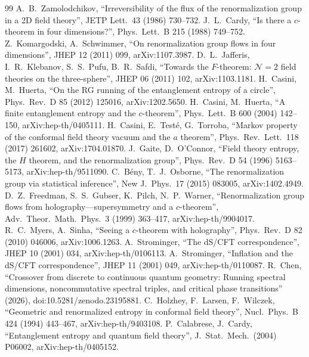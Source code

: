\documentclass[11pt]{article}
\theoremstyle{remark}\newtheorem*{remark}{Remark}
\begin{document}
\begingroup\raggedright
\begin{thebibliography}{99}\small
{} A.~B.~Zamolodchikov, ``Irreversibility of the flux of the renormalization group in a 2D field theory'', JETP Lett.\ 43 (1986) 730--732.
 J.~L.~Cardy, ``Is there a $c$-theorem in four dimensions?'', Phys.\ Lett.\ B 215 (1988) 749--752.
 Z.~Komargodski, A.~Schwimmer, ``On renormalization group flows in four dimensions'', JHEP 12 (2011) 099, arXiv:1107.3987.
 D.~L.~Jafferis, I.~R.~Klebanov, S.~S.~Pufu, B.~R.~Safdi, ``Towards the $F$-theorem: $\mathcal N=2$ field theories on the three-sphere'', JHEP 06 (2011) 102, arXiv:1103.1181.
 H.~Casini, M.~Huerta, ``On the RG running of the entanglement entropy of a circle'', Phys.\ Rev.\ D 85 (2012) 125016, arXiv:1202.5650.
 H.~Casini, M.~Huerta, ``A finite entanglement entropy and the $c$-theorem'', Phys.\ Lett.\ B 600 (2004) 142--150, arXiv:hep-th/0405111.
 H.~Casini, E.~Test\'e, G.~Torroba, ``Markov property of the conformal field theory vacuum and the $a$ theorem'', Phys.\ Rev.\ Lett.\ 118 (2017) 261602, arXiv:1704.01870.
 J.~Gaite, D.~O'Connor, ``Field theory entropy, the $H$ theorem, and the renormalization group'', Phys.\ Rev.\ D 54 (1996) 5163--5173, arXiv:hep-th/9511090.
 C.~B\'eny, T.~J.~Osborne, ``The renormalization group via statistical inference'', New J.\ Phys.\ 17 (2015) 083005, arXiv:1402.4949.
 D.~Z.~Freedman, S.~S.~Gubser, K.~Pilch, N.~P.~Warner, ``Renormalization group flows from holography---supersymmetry and a $c$-theorem'', Adv.\ Theor.\ Math.\ Phys.\ 3 (1999) 363--417, arXiv:hep-th/9904017.
 R.~C.~Myers, A.~Sinha, ``Seeing a $c$-theorem with holography'', Phys.\ Rev.\ D 82 (2010) 046006, arXiv:1006.1263.
 A.~Strominger, ``The dS/CFT correspondence'', JHEP 10 (2001) 034, arXiv:hep-th/0106113.
 A.~Strominger, ``Inflation and the dS/CFT correspondence'', JHEP 11 (2001) 049, arXiv:hep-th/0110087.
 R.~Chen, ``Crossover from discrete to continuous quantum geometry: Running spectral dimensions, noncommutative spectral triples, and critical phase transitions'' (2026), doi:10.5281/zenodo.23195881.
 C.~Holzhey, F.~Larsen, F.~Wilczek, ``Geometric and renormalized entropy in conformal field theory'', Nucl.\ Phys.\ B 424 (1994) 443--467, arXiv:hep-th/9403108.
 P.~Calabrese, J.~Cardy, ``Entanglement entropy and quantum field theory'', J.\ Stat.\ Mech.\ (2004) P06002, arXiv:hep-th/0405152.

\end{thebibliography}
\end{document}
